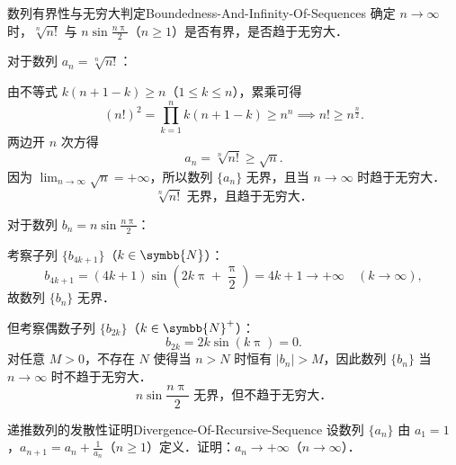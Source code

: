 \begin{problem}{数列有界性与无穷大判定}{Boundedness-And-Infinity-Of-Sequences}
    确定 $n \to \infty$ 时，$\sqrt[n]{n!}$ 与 $n \sin \frac{n\uppi}{2}$（$n \geqslant 1$）是否有界，是否趋于无穷大．
\end{problem}

\begin{solution}
    对于数列 $a_n = \sqrt[n]{n!}$：

    由不等式 $k(n + 1 - k) \geqslant n$（$1 \leqslant k \leqslant n$），累乘可得
    \begin{equation}
        (n!)^2 = \prod_{k=1}^n k(n + 1 - k) \geqslant n^n \implies n! \geqslant n^{\frac{n}{2}}.
    \end{equation}
    两边开 $n$ 次方得
    \begin{equation}
        a_n = \sqrt[n]{n!} \geqslant \sqrt{n}.
    \end{equation}
    因为 $\lim_{n\to\infty} \sqrt{n} = +\infty$，所以数列 $\{a_n\}$ 无界，且当 $n \to \infty$ 时趋于无穷大．
    \begin{equation}
        \boxed{\sqrt[n]{n!} \text{ 无界，且趋于无穷大．}}
    \end{equation}

    对于数列 $b_n = n \sin \frac{n\uppi}{2}$：

    考察子列 $\{b_{4k+1}\}$（$k \in \symbb{N}$）：
    \begin{equation}
        b_{4k+1} = (4k+1) \sin \left( 2k\uppi + \frac{\uppi}{2} \right) = 4k + 1 \to +\infty \quad (k \to \infty),
    \end{equation}
    故数列 $\{b_n\}$ 无界．

    但考察偶数子列 $\{b_{2k}\}$（$k \in \symbb{N}^+$）：
    \begin{equation}
        b_{2k} = 2k \sin(k\uppi) = 0.
    \end{equation}
    对任意 $M > 0$，不存在 $N$ 使得当 $n > N$ 时恒有 $|b_n| > M$，因此数列 $\{b_n\}$ 当 $n \to \infty$ 时不趋于无穷大．
    \begin{equation}
        \boxed{n \sin \frac{n\uppi}{2} \text{ 无界，但不趋于无穷大．}}
    \end{equation}
\end{solution}

\begin{problem}{递推数列的发散性证明}{Divergence-Of-Recursive-Sequence}
    设数列 $\{a_n\}$ 由 $a_1 = 1$，$a_{n+1} = a_n + \frac{1}{a_n}$（$n \geqslant 1$）定义．证明：$a_n \to +\infty$（$n \to \infty$）．
\end{problem}

